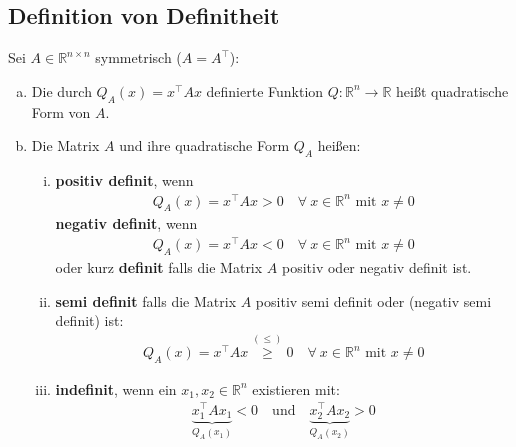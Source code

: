 \documentclass[11pt,a4paper]{book}
\newcommand {\R}	{\mathbb{R}}
\newcommand {\Rn}	{\mathbb{R}^n}
\newcommand {\Rnxn}	{\mathbb{R}^{n \times n}}
\newcommand{\1}    	{\mathbbm{1}}
\newcommand{\mitt}	{\textrm{ mit }}
\begin{document}
\subsection{Definition von Definitheit}
Sei \(A \in \Rnxn\) symmetrisch (\(A = A^\top\)):
\begin{enumerate}[a.~]
	\item Die durch \(Q_A(x) = x^\top A x\) definierte Funktion \(Q: \Rn \rightarrow \R\) heißt quadratische Form von \(A\).
	\item Die Matrix \(A\) und ihre quadratische Form \(Q_A\) heißen:
	\begin{enumerate}[(i)]
		\item \textbf{positiv definit}, wenn
		\begin{align*}
			Q_A(x) = x^\top A x > 0 \quad \forall~ x \in \Rn \mitt x \neq 0
		\end{align*}
		\textbf{negativ definit}, wenn
		\begin{align*}
			Q_A(x) = x^\top A x < 0 \quad \forall~ x \in \Rn \mitt x \neq 0
		\end{align*}
		oder kurz \textbf{definit} falls die Matrix \(A\) positiv oder negativ definit ist.
		\item \textbf{semi definit} falls die Matrix \(A\) 
		positiv semi definit oder (negativ semi definit) ist:
		\begin{align*}
			Q_A(x) = x^\top A x \stackrel{(\leqslant)}{\geqslant} 0 \quad \forall~ x \in \Rn \mitt x \neq 0
		\end{align*}
		\item \textbf{indefinit}, wenn ein \(x_1, x_2 \in \Rn\) existieren mit:
		\begin{align*}
			\underbrace{x_1^\top A x_1}_{Q_A(x_1)} < 0
			\quad \textrm{und} \quad 
			\underbrace{x_2^\top A x_2}_{Q_A(x_2)} > 0
		\end{align*}
	\end{enumerate}
\end{enumerate}
\end{document}
